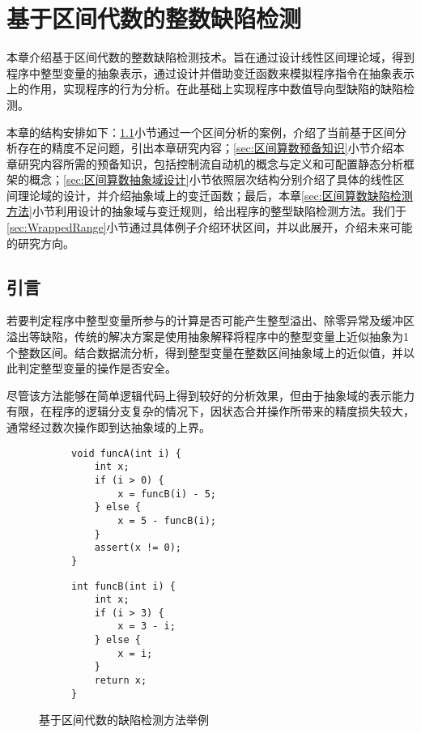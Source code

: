
\chapter{基于区间代数的整数缺陷检测}
\label{sec:区间算数}

本章介绍基于区间代数的整数缺陷检测技术。旨在通过设计线性区间理论域，得到程序中整型变量的抽象表示，通过设计并借助变迁函数来模拟程序指令在抽象表示上的作用，实现程序的行为分析。在此基础上实现程序中数值导向型缺陷的缺陷检测。

本章的结构安排如下：\ref{sec:区间算数引言}小节通过一个区间分析的案例，介绍了当前基于区间分析存在的精度不足问题，引出本章研究内容；\ref{sec:区间算数预备知识}小节介绍本章研究内容所需的预备知识，包括控制流自动机的概念与定义和可配置静态分析框架的概念；\ref{sec:区间算数抽象域设计}小节依照层次结构分别介绍了具体的线性区间理论域的设计，并介绍抽象域上的变迁函数；最后，本章\ref{sec:区间算数缺陷检测方法}小节利用设计的抽象域与变迁规则，给出程序的整型缺陷检测方法。我们于\ref{sec:WrappedRange}小节通过具体例子介绍环状区间，并以此展开，介绍未来可能的研究方向。


\section{引言}
\label{sec:区间算数引言}

若要判定程序中整型变量所参与的计算是否可能产生整型溢出、除零异常及缓冲区溢出等缺陷，传统的解决方案是使用抽象解释将程序中的整型变量上近似抽象为1个整数区间。结合数据流分析，得到整型变量在整数区间抽象域上的近似值，并以此判定整型变量的操作是否安全。

尽管该方法能够在简单逻辑代码上得到较好的分析效果，但由于抽象域的表示能力有限，在程序的逻辑分支复杂的情况下，因状态合并操作所带来的精度损失较大，通常经过数次操作即到达抽象域的上界。

\begin{figure}[htb]
	\begin{subfigure}[b]{.5\linewidth}
			\begin{lstlisting}[xleftmargin=.15\textwidth]
void funcA(int i) {
	int x;
	if (i > 0) {
		x = funcB(i) - 5;
	} else {
		x = 5 - funcB(i);
	}
	assert(x != 0);
}
			\end{lstlisting}
	\end{subfigure}
	\begin{subfigure}[b]{.5\linewidth}
			\begin{lstlisting}[xleftmargin=.25\textwidth]
int funcB(int i) {
	int x;
	if (i > 3) {
		x = 3 - i;
	} else {
		x = i;
	}
	return x;
}
			\end{lstlisting}
\end{subfigure}
	\caption{基于区间代数的缺陷检测方法举例}
	\label{fig:codeExampleForSignRange}
\end{figure}{\tiny }

